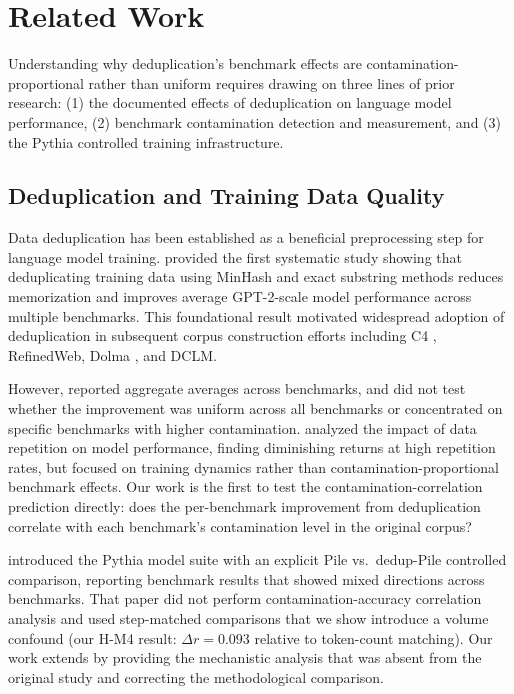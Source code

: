 \section{Related Work}
\label{sec:related}

Understanding why deduplication's benchmark effects are contamination-proportional rather
than uniform requires drawing on three lines of prior research: (1) the documented effects
of deduplication on language model performance, (2) benchmark contamination detection and
measurement, and (3) the Pythia controlled training infrastructure.

\subsection{Deduplication and Training Data Quality}

Data deduplication has been established as a beneficial preprocessing step for language
model training. \citet{Lee2022Deduplicating} provided the first systematic study showing that
deduplicating training data using MinHash and exact substring methods reduces memorization
and improves average GPT-2-scale model performance across multiple benchmarks.
This foundational result motivated widespread adoption of deduplication in subsequent
corpus construction efforts including C4 \citep{Raffel2020Exploring}, RefinedWeb, Dolma
\citep{Soldaini2024Dolma}, and DCLM.

However, \citet{Lee2022Deduplicating} reported aggregate averages across benchmarks, and did not
test whether the improvement was uniform across all benchmarks or concentrated on
specific benchmarks with higher contamination. \citet{Muennighoff2023Scaling} analyzed
the impact of data repetition on model performance, finding diminishing returns at
high repetition rates, but focused on training dynamics rather than contamination-proportional
benchmark effects. Our work is the first to test the contamination-correlation prediction
directly: does the per-benchmark improvement from deduplication correlate with each
benchmark's contamination level in the original corpus?

\citet{Biderman2023Pythia} introduced the Pythia model suite with an explicit Pile vs.\
dedup-Pile controlled comparison, reporting benchmark results that showed mixed directions
across benchmarks. That paper did not perform contamination-accuracy correlation analysis
and used step-matched comparisons that we show introduce a volume confound
(our H-M4 result: $\Delta r = 0.093$ relative to token-count matching). Our work extends
\citet{Biderman2023Pythia} by providing the mechanistic analysis that was absent from the
original study and correcting the methodological comparison.

